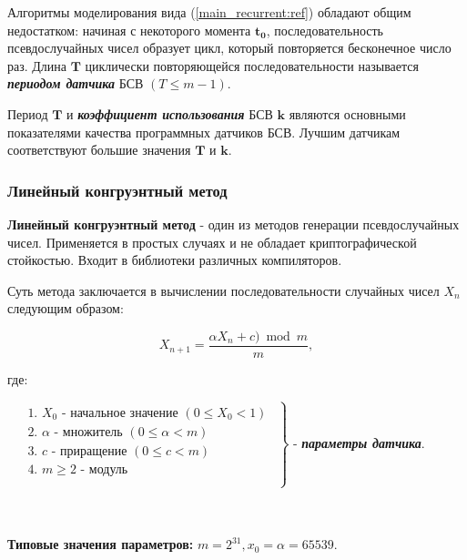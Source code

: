 Алгоритмы моделирования вида (\ref{main_recurrent:ref}) обладают общим недостатком: начиная с некоторого момента $\mathbf{t_{0}}$, последовательность псевдослучайных чисел образует цикл, который повторяется бесконечное число раз. Длина $\mathbf{T}$ циклически повторяющейся последовательности называется \textbf{\textit{периодом датчика}} БСВ $(T \leq m - 1)$.

Период $\mathbf{T}$ и \textbf{\textit{коэффициент использования}} БСВ $\mathbf{k}$ являются основными показателями качества программных датчиков БСВ. Лучшим датчикам соответствуют большие значения $\mathbf{T}$ и $\mathbf{k}$.

\subsubsection {Линейный конгруэнтный метод}\label{linear_congruential_generator}
\textbf{Линейный конгруэнтный метод} - один из методов генерации псевдослучайных чисел. Применяется в простых случаях и не обладает криптографической стойкостью. Входит в библиотеки различных компиляторов.

Суть метода заключается в вычислении последовательности случайных чисел $X_n$ следующим образом:

\begin{equation}
	X_{n+1} = \frac{\alpha X_{n} + c) \bmod m}{m},
	\label{linear_congruential_generator_formula:ref}
\end{equation}

где:

\hfill\parbox{17.5cm}{
	$
		\left.
		\begin{array}{ccc}
			\begin{aligned}
				 & \text{1. } X_{0} \text{ - начальное значение } (0 \leqslant X_{0} < 1) \\
				 & \text{2. } \alpha \text{ - множитель } (0 \leqslant \alpha < m)        \\
				 & \text{3. } c \text{ - приращение } (0 \leqslant c < m )                \\
				 & \text{4. } m \geq 2 \text{ - модуль }                                  \\
			\end{aligned}
		\end{array}
		\right\}
	$ - \textbf{\textit{параметры датчика}}.
}\\\\

\textbf{Типовые значения параметров:} $m = 2^{31}, x_0 = \alpha = 65539$.

